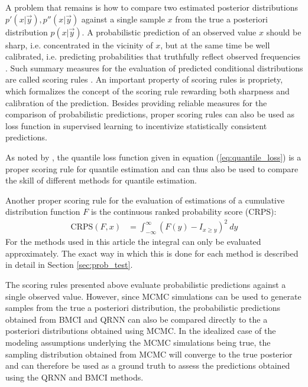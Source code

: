 \documentclass[journal abbreviation, manuscript]{copernicus}
\begin{document}
  A problem that remains is how to compare two estimated posterior distributions
  $p'(x | \vec{y}), p''(x | \vec{y})$ against a single sample $x$ from the true
  a posteriori distribution $p(x | \vec{y})$. A probabilistic prediction of an
  observed value $x$ should be sharp, i.e. concentrated in the vicinity of
  $x$, but at the same time be well calibrated, i.e. predicting probabilities
  that truthfully reflect observed frequencies \citep{gneiting_2}. Such summary
  measures for the evaluation of predicted conditional distributions are called
  scoring rules \citep{gneiting}. An important property of scoring rules
  is propriety, which formalizes the concept of the scoring rule rewarding both
  sharpness and calibration of the prediction. Besides providing reliable
  measures for the comparison of probabilistic predictions, proper scoring rules
  can also be used as loss function in supervised learning to incentivize
  statistically consistent predictions.

  As noted by \cite{gneiting}, the quantile loss function given in equation
  (\ref{eq:quantile_loss}) is a proper scoring rule for quantile estimation
  and can thus also be used to compare the skill of different methods for
  quantile estimation.

  Another proper scoring rule for the evaluation of estimations of a
  cumulative distribution function $F$ is the continuous ranked probability
  score (CRPS):
  \begin{align}\label{eq:crps}
    \text{CRPS}(F, x) &= \int_{-\infty}^{\infty} 
    \left ( F(y) - I_{x \geq y} \right )^2 \: dy
  \end{align}
  For the methods used in this article the integral  can only
  be evaluated approximately. The exact way in which this is done for each
  method is described in detail in Section \ref{sec:prob_test}.

  The scoring rules presented above evaluate probabilistic predictions against a
  single observed value. However, since MCMC simulations can be used to generate
  samples from the true a posteriori distribution, the probabilistic predictions
  obtained from BMCI and QRNN can also be compared directly to the a posteriori
  distributions obtained using MCMC. In the idealized case of the modeling
  assumptions underlying the MCMC simulations being true, the sampling
  distribution obtained from MCMC will converge to the true posterior and can
  therefore be used as a ground truth to assess the predictions obtained using
  the QRNN and BMCI methods.
\end{document}
